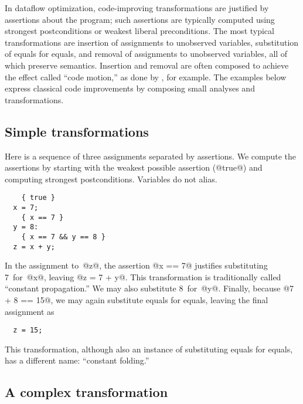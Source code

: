 \documentclass[blockstyle,preprint,nocopyrightspace]{sigplanconf}
\newcommand{\authornote}[1]{{\em #1}}
\def\authornote#1{\unskip\relax}
\newcommand{\simon}[1]{\authornote{SLPJ: #1}}
\newcommand\seclabel[1]{\label{sec:#1}}
\begin{document}
\seclabel{example:transforms}
\seclabel{example:xforms}

In dataflow optimization, code-improving transformations are justified
by assertions about the program;
such assertions are typically computed using
strongest postconditions or weakest liberal preconditions.
The most typical transformations are
insertion of assignments to unobserved variables,
substitution of equals for equals, 
and
removal of assignments to unobserved variables,
all of which preserve semantics.
Insertion and removal are often composed to achieve the effect called
``code motion,'' as done by \citet{knoop:lazy-code-motion}, for example.
The examples below express classical code
improvements by composing small analyses and transformations.



\subsection{Simple transformations}

\seclabel{constant-propagation}

Here is a sequence of three assignments separated by assertions.
We compute the assertions by starting with the weakest possible
assertion (@true@) and computing strongest postconditions.
{Variables do not alias.}
\begin{verbatim}
    { true }
  x = 7;
    { x == 7 }
  y = 8: 
    { x == 7 && y == 8 }
  z = x + y;
\end{verbatim}
In the assignment to~@z@, the assertion @x == 7@ justifies
substituting 7~for~@x@, leaving @z = 7 + y@.  
This transformation is traditionally called ``constant propagation.''
We may also substitute 8~for~@y@.
Finally, because @7 + 8 == 15@, we may again substitute equals for
equals, leaving the final assignment as
\begin{verbatim}
  z = 15;
\end{verbatim}
This transformation, although also an instance of substituting equals
for equals, has a different name: ``constant folding.''

\subsection{A complex transformation}
\simon{It's a pity that this transformation occupies nearly the entire second page, 
and then plays no subsequent role in the paper whatsoever.
One possibility: move it to ``the next 700'' section, as a substantiating example
to the claims made there.
But then we'd need another example here... well the sink/reload example of
Section 4 might be perfect.}
\end{document}
